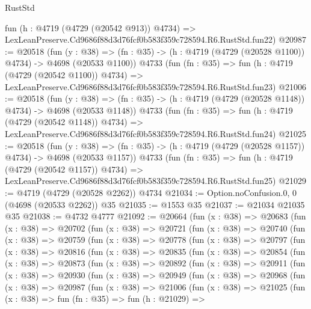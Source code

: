 \begin{lexlean}{RustStd}
\begin{coremodule}
    fun (h : @4719 (@4729 (@20542 @913)) @4734) =>
    LexLeanPreserve.Cd9686f88d3d76fcf0b583f359c728594.R6.RustStd.fun22)
@20987 := @20518
    (fun (y : @38) =>
    (fn : @35) -> (h : @4719 (@4729 (@20528 @1100)) @4734) -> @4698 (@20533 @1100))
    @4733
    (fun (fn : @35) =>
    fun (h : @4719 (@4729 (@20542 @1100)) @4734) =>
    LexLeanPreserve.Cd9686f88d3d76fcf0b583f359c728594.R6.RustStd.fun23)
@21006 := @20518
    (fun (y : @38) =>
    (fn : @35) -> (h : @4719 (@4729 (@20528 @1148)) @4734) -> @4698 (@20533 @1148))
    @4733
    (fun (fn : @35) =>
    fun (h : @4719 (@4729 (@20542 @1148)) @4734) =>
    LexLeanPreserve.Cd9686f88d3d76fcf0b583f359c728594.R6.RustStd.fun24)
@21025 := @20518
    (fun (y : @38) =>
    (fn : @35) -> (h : @4719 (@4729 (@20528 @1157)) @4734) -> @4698 (@20533 @1157))
    @4733
    (fun (fn : @35) =>
    fun (h : @4719 (@4729 (@20542 @1157)) @4734) =>
    LexLeanPreserve.Cd9686f88d3d76fcf0b583f359c728594.R6.RustStd.fun25)
@21029 := @4719 (@4729 (@20528 @2262)) @4734
@21034 := Option.noConfusion.{0, 0} (@4698 (@20533 @2262)) @35
@21035 := @1553 @35
@21037 := @21034 @21035 @35
@21038 := @4732 @4777
@21092 := @20664
    (fun (x : @38) =>
    @20683
      (fun (x : @38) =>
      @20702
        (fun (x : @38) =>
        @20721
          (fun (x : @38) =>
          @20740
            (fun (x : @38) =>
            @20759
              (fun (x : @38) =>
              @20778
                (fun (x : @38) =>
                @20797
                  (fun (x : @38) =>
                  @20816
                    (fun (x : @38) =>
                    @20835
                      (fun (x : @38) =>
                      @20854
                        (fun (x : @38) =>
                        @20873
                          (fun (x : @38) =>
                          @20892
                            (fun (x : @38) =>
                            @20911
                              (fun (x : @38) =>
                              @20930
                                (fun (x : @38) =>
                                @20949
                                  (fun (x : @38) =>
                                  @20968
                                    (fun (x : @38) =>
                                    @20987
                                      (fun (x : @38) =>
                                      @21006
                                        (fun (x : @38) =>
                                        @21025
                                          (fun (x : @38) =>
                                          fun (fn : @35) =>
                                          fun (h : @21029) =>

\end{coremodule}
\end{lexlean}
